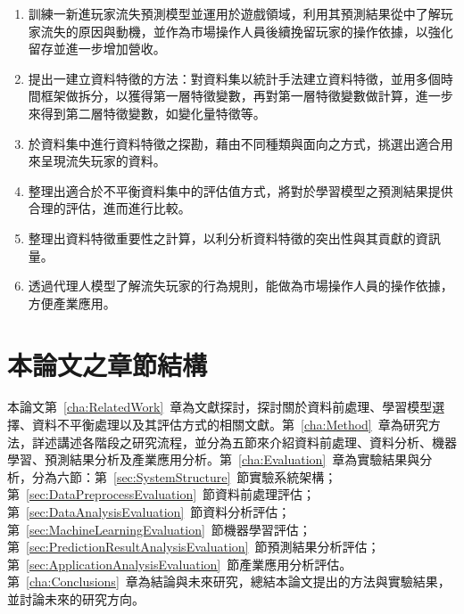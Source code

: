 \begin{enumerate}
    \item 訓練一新進玩家流失預測模型並運用於遊戲領域，利用其預測結果從中了解玩家流失的原因與動機，並作為市場操作人員後續挽留玩家的操作依據，以強化留存並進一步增加營收。
    \item 提出一建立資料特徵的方法：對資料集以統計手法建立資料特徵，並用多個時間框架做拆分，以獲得第一層特徵變數，再對第一層特徵變數做計算，進一步來得到第二層特徵變數，如變化量特徵等。
    \item 於資料集中進行資料特徵之探勘，藉由不同種類與面向之方式，挑選出適合用來呈現流失玩家的資料。
    \item 整理出適合於不平衡資料集中的評估值方式，將對於學習模型之預測結果提供合理的評估，進而進行比較。
    \item 整理出資料特徵重要性之計算，以利分析資料特徵的突出性與其貢獻的資訊量。
    \item 透過代理人模型了解流失玩家的行為規則，能做為市場操作人員的操作依據，方便產業應用。
\end{enumerate}

\section{本論文之章節結構}

本論文第~\ref{cha:RelatedWork}~章為文獻探討，探討關於資料前處理、學習模型選擇、資料不平衡處理以及其評估方式的相關文獻。第~\ref{cha:Method}~章為研究方法，詳述講述各階段之研究流程，並分為五節來介紹資料前處理、資料分析、機器學習、預測結果分析及產業應用分析。第~\ref{cha:Evaluation}~章為實驗結果與分析，分為六節：第~\ref{sec:SystemStructure}~節實驗系統架構；第~\ref{sec:DataPreprocessEvaluation}~節資料前處理評估；第~\ref{sec:DataAnalysisEvaluation}~節資料分析評估；第~\ref{sec:MachineLearningEvaluation}~節機器學習評估；第~\ref{sec:PredictionResultAnalysisEvaluation}~節預測結果分析評估；第~\ref{sec:ApplicationAnalysisEvaluation}~節產業應用分析評估。第~\ref{cha:Conclusions}~章為結論與未來研究，總結本論文提出的方法與實驗結果，並討論未來的研究方向。
\newpage